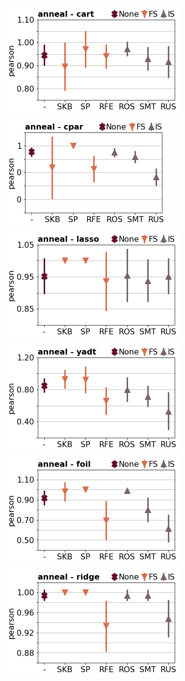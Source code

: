 \documentclass[runningheads,a4paper]{llncs}
\begin{document}
\begin{figure}[!h]
\includegraphics[width=0.32\linewidth]{fig/preps_anneal_DT_sklearn_sample_pearson.png}
\includegraphics[width=0.32\linewidth]{fig/preps_anneal_RB_cpar_sample_pearson.png}
\includegraphics[width=0.32\linewidth]{fig/preps_anneal_LM_lasso_sample_pearson.png}
\includegraphics[width=0.32\linewidth]{fig/preps_anneal_DT_yadt_sample_pearson.png}
\includegraphics[width=0.32\linewidth]{fig/preps_anneal_RB_foil_sample_pearson.png}
\includegraphics[width=0.32\linewidth]{fig/preps_anneal_LM_ridge_sample_pearson.png}
\end{figure}
\end{document}
